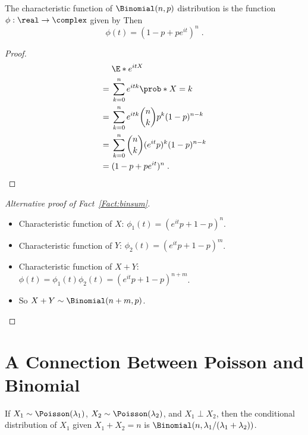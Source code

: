 \filbreak

\begin{fact}
The characteristic function of $\Binomial(n,p)$ distribution is the function $\phi:\real\to\complex$ given by  
Then    
\[
\phi(t) = \left(1-p+pe^{it}\right)^n\;.
\]
\end{fact}

\begin{proof}
\begin{align*}
 &  \E*{e^{itX}}\\
={}&\sum_{k=0}^n e^{itk} \prob*{X=k}\\
={}&\sum_{k=0}^n e^{itk} \binom{n}{k} p^k (1-p)^{n-k}\\
={}&\sum_{k=0}^n \binom{n}{k} (e^{it}p)^k (1-p)^{n-k}\\
={}&(1-p+pe^{it})^n\;.
\end{align*}
\end{proof}


\begin{proof}[Alternative proof of Fact~\ref{Fact:binsum}]
\;
\begin{itemize}
\item Characteristic function of $X$: $\phi_1(t)=(e^{it}p+1-p)^n$.
\item Characteristic function of $Y$: $\phi_2(t)=(e^{it}p+1-p)^m$.
\item Characteristic function of $X+Y$: $\phi(t)=\phi_1(t) \phi_2(t) = (e^{it}p+1-p)^{n+m}$.
\item So $X+Y\sim\Binomial(n+m,p)$.
\end{itemize}
\end{proof}

\filbreak

\section{A Connection Between Poisson and Binomial}

\begin{fact}
If $X_1\sim\Poisson(\lambda_1)$, $X_2\sim\Poisson(\lambda_2)$, and $X_1\perp X_2$, then the conditional distribution of $X_1$ given $X_1+X_2=n$ is $\Binomial(n,\lambda_1/(\lambda_1+\lambda_2))$.
\end{fact}

